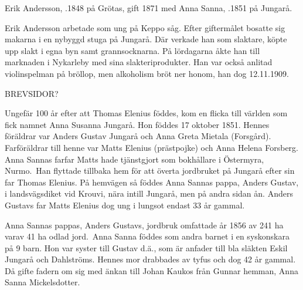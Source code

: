 Erik Andersson, .1848 på Grötas, gift 1871 med Anna Sanna, .1851 på Jungarå.
\begin{jhchildren}
  \item {}
  \item {}
  \item {}
  \item {}
  \item {}
  \item {}
\end{jhchildren}
Erik Andersson arbetade som ung på Keppo såg. Efter giftermålet bosatte sig makarna i en nybyggd stuga på Jungarå. Där verkade han som slaktare, köpte upp slakt i egna byn samt grannsocknarna. På lördagarna åkte han till marknaden i Nykarleby med sina slakteriprodukter. Han var också anlitad violinspelman på bröllop, men alkoholism bröt ner honom, han dog 12.11.1909.

BREVSIDOR?



Ungefär 100 år efter att Thomas Elenius föddes, kom en flicka till världen som fick namnet Anna Susanna Jungarå. Hon föddes 17 oktober 1851. Hennes föräldrar var Anders Gustav Jungarå och Anna Greta Mietala (Forsgård). Farföräldrar till henne var Matts Elenius (prästpojke) och Anna Helena Forsberg. Anna Sannas farfar Matts hade tjänstgjort som bokhållare i Östermyra, Nurmo. Han flyttade tillbaka hem för att överta jordbruket på Jungarå efter sin far Thomas Elenius. På hemvägen så föddes Anna Sannas pappa, Anders Gustav, i landsvägsdiket vid Krouvi, nära intill Jungarå, men på andra sidan ån. Anders Gustavs far Matts Elenius dog ung i lungsot endast 33 år gammal.

Anna Sannas pappas, Anders Gustavs, jordbruk omfattade år 1856 av 241 ha varav 41 ha odlad jord. Anna Sanna föddes som andra barnet i en syskonskara på 9 barn. Hon var syster till Gustav d.ä., som är anfader till bla släkten Eskil Jungarå och Dahlströms. Hennes mor drabbades av tyfus och dog 42 år gammal. Då gifte fadern om sig med änkan till Johan Kaukos från Gunnar hemman, Anna Sanna Mickelsdotter.

